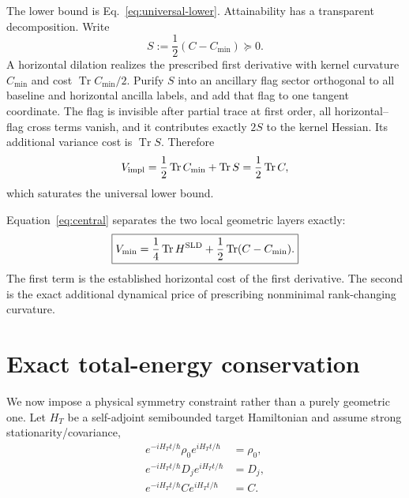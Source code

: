 \documentclass[aps,pra,preprint,nofootinbib]{revtex4-2}
\newcommand{\Tr}{\operatorname{Tr}}
\newcommand{\rhozero}{\rho_0}
\newcommand{\Vimpl}{V_{\rm impl}}
\newcommand{\Vmin}{V_{\min}}
\newcommand{\Cmin}{C_{\min}}
\newcommand{\Cker}{C}
\newcommand{\HT}{H_T}
\begin{document}
The lower bound is Eq.~\eqref{eq:universal-lower}. Attainability has a transparent decomposition. Write
\begin{equation}
 S:=\frac12(\Cker-\Cmin)\succeq0.
 \label{eq:Sdef}
\end{equation}
A horizontal dilation realizes the prescribed first derivative with kernel curvature $\Cmin$ and cost $\Tr\Cmin/2$. Purify $S$ into an ancillary flag sector orthogonal to all baseline and horizontal ancilla labels, and add that flag to one tangent coordinate. The flag is invisible after partial trace at first order, all horizontal--flag cross terms vanish, and it contributes exactly $2S$ to the kernel Hessian. Its additional variance cost is $\Tr S$. Therefore
\begin{equation}
 \Vimpl=\frac12\Tr\Cmin+\Tr S
 =\frac12\Tr\Cker,
\end{equation}
which saturates the universal lower bound.

Equation~\eqref{eq:central} separates the two local geometric layers exactly:
\begin{equation}
 \boxed{
 \Vmin
 =\frac14\Tr H^{\rm SLD}
 +\frac12\Tr(\Cker-\Cmin).
 }
 \label{eq:decomposition}
\end{equation}
The first term is the established horizontal cost of the first derivative. The second is the exact additional dynamical price of prescribing nonminimal rank-changing curvature.

\section{Exact total-energy conservation}

We now impose a physical symmetry constraint rather than a purely geometric one. Let $\HT$ be a self-adjoint semibounded target Hamiltonian and assume strong stationarity/covariance,
\begin{align}
 e^{-i\HT t/\hbar}\rhozero e^{i\HT t/\hbar}&=\rhozero,\label{eq:covariance-rho}\\
 e^{-i\HT t/\hbar}D_je^{i\HT t/\hbar}&=D_j,\\
 e^{-i\HT t/\hbar}\Cker e^{i\HT t/\hbar}&=\Cker.
 \label{eq:covariance}
\end{align}
\end{document}

